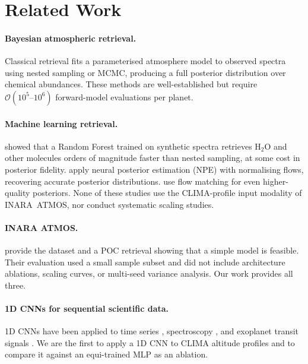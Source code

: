 \documentclass[11pt]{article}
\begin{document}
\section{Related Work}
\label{sec:related}

\paragraph{Bayesian atmospheric retrieval.}
Classical retrieval fits a parameterised atmosphere model to observed spectra
using nested sampling \citep{skilling2004} or MCMC, producing a full posterior
distribution over chemical abundances. These methods are well-established but
require $\mathcal{O}(10^5\text{--}10^6)$ forward-model evaluations per planet.

\paragraph{Machine learning retrieval.}
\citet{marquez2018} showed that a Random Forest trained on synthetic spectra
retrieves H$_2$O and other molecules orders of magnitude faster than nested
sampling, at some cost in posterior fidelity. \citet{vasist2023} apply
neural posterior estimation (NPE) with normalising flows, recovering accurate
posterior distributions. \citet{gebhard2024} use flow matching for even
higher-quality posteriors. None of these studies use the CLIMA-profile input
modality of INARA~ATMOS, nor conduct systematic scaling studies.

\paragraph{INARA ATMOS.}
\citet{zorzan2025} provide the dataset and a POC retrieval showing that a
simple model is feasible. Their evaluation used a small sample subset and did
not include architecture ablations, scaling curves, or multi-seed variance
analysis. Our work provides all three.

\paragraph{1D CNNs for sequential scientific data.}
1D CNNs have been applied to time series \citep{wang2017}, spectroscopy
\citep{leung2019}, and exoplanet transit signals \citep{ansdell2018}.
We are the first to apply a 1D CNN to CLIMA altitude profiles and to compare
it against an equi-trained MLP as an ablation.
\end{document}
